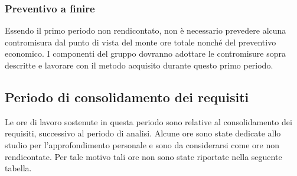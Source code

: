 \subsubsection{Preventivo a finire} 
Essendo il primo periodo non rendicontato, non è necessario prevedere alcuna contromisura dal punto di vista del monte ore totale nonché del preventivo economico. I componenti del gruppo dovranno adottare le contromisure sopra descritte e lavorare con il metodo acquisito durante questo primo periodo.

\subsection{Periodo di consolidamento dei requisiti}
Le ore di lavoro sostenute in questa periodo sono relative al consolidamento dei requisiti, successivo al periodo di analisi. Alcune ore sono state dedicate allo studio per l'approfondimento personale e sono da considerarsi come ore non rendicontate. Per tale motivo tali ore non sono state riportate nella seguente tabella.

